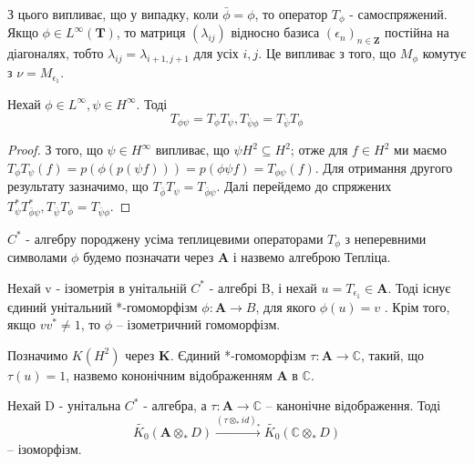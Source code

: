 З цього випливає, що у випадку, коли $\bar{\phi} = \phi$, то оператор $T_\phi$ - самоспряжений.
Якщо $\phi \in L^\infty(\mathbf{T})$, то матриця $(\lambda_{ij})$ відносно базиса $(\epsilon_n)_{n \in \mathbf{Z}}$
постійна на \\ діагоналях, тобто $\lambda_{ij} = \lambda_{i+1, j+1}$ для усіх $i,j$.
Це випливає з того, що $M_\phi$ комутує з $\nu = M_\epsilon_1$.
\begin{theorem}
    Нехай $\phi \in L^\infty, \psi \in H^\infty$.
    Тоді
    \begin{equation*}
        T_{\phi \psi} = T_{\phi}T_{\psi}, T_{\bar{\psi} \phi} = T_{\bar{\psi}} T_{\phi}
    \end{equation*}

    \begin{proof}
        З того, що $\psi \in H^\infty$ випливає, що $\psi H^2 \subseteq H^2$;
        отже для $f \in H^2$ ми маємо $T_\phi T_\psi (f) = p(\phi(p(\psi f))) =
        p(\phi \psi f) = T_{\phi \psi} (f)$.
        Для отримання другого результату зазначимо, що $T_{\bar{\phi}} T_{\psi} =
        T_{\bar{\phi} \psi}$.
        Далі перейдемо до спряжених $T^*_\psi T^*_{\bar{\phi}\psi}, T_{\bar{\psi}} T_\phi = T_{\bar{\psi} \phi}$.
    \end{proof}
\end{theorem}

$C^*$ - алгебру породжену усіма теплицевими операторами $T_\phi$ з неперевними
символами $\phi$ будемо позначати через $ \mathbf{A}$ і назвемо алгеброю Тепліца.

\begin{theorem}[Кобурн]
    Нехай v - ізометрія в унітальній $C^*$ - алгебрі B, і нехай $u = T_{\epsilon_1} \in \mathbf{A}$.
    Тоді існує єдиний унітальний *-гомоморфізм $\phi: \mathbf{A} \to B$,
    для якого $\phi(u) = v$ .
    Крім того, якщо $v v^* \neq 1$, то $\phi$ -- ізометричний гомоморфізм.
\end{theorem}

Позначимо $K(H^2)$ через $\mathbf{K}$.
Єдиний *-гомоморфізм $\tau: \mathbf{A} \to \mathbb{C}$, такий, що $\tau(u) = 1$,
назвемо кононічним відображенням $\mathbf{A}$ в $\mathbb{C}$.

\begin{theorem}[Кунц]
    Нехай D - унітальна $C^*$ - алгебра, а $\tau: \mathbf{A} \to \mathbb{C}$
    -- канонічне відображення.
    Тоді
    \begin{equation*}
        \widetilde{K_0}(\mathbf{A} \otimes_* D) \xrightarrow{(\tau \otimes_* id)_*} \widetilde{K_0}(\mathbb{C} \otimes_* D)
    \end{equation*}
    --  ізоморфізм.
\end{theorem}

